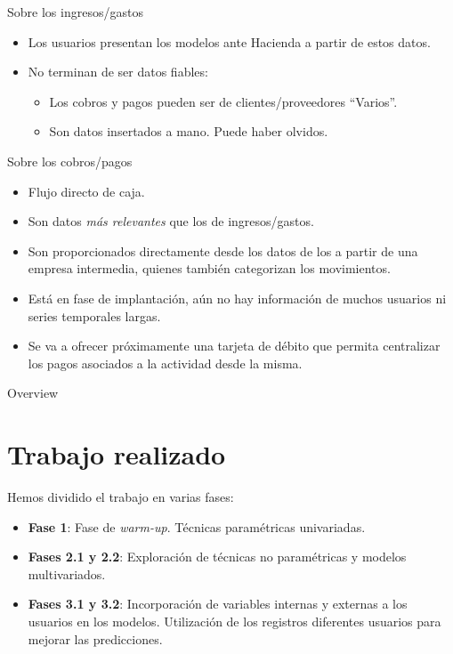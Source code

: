 \documentclass[12pt, aspectratio=169]{beamer} %
\begin{document}
\begin{frame}{Sobre los ingresos/gastos}
  \begin{itemize}
  \item Los usuarios presentan los modelos ante Hacienda a partir de estos datos.
  \item No terminan de ser datos fiables:
    \begin{itemize}
    \item Los cobros y pagos pueden ser de clientes/proveedores ``Varios''.
    \item Son datos insertados a mano. Puede haber olvidos.
    \end{itemize}
  \end{itemize}
\end{frame}

\begin{frame}{Sobre los cobros/pagos}
  \begin{itemize}
  \item Flujo directo de caja.
  \item Son datos \textit{más relevantes} que los de ingresos/gastos. 
  \item Son proporcionados directamente desde los datos de los a partir de una empresa intermedia, quienes también categorizan los movimientos.
  \item Está en fase de implantación, aún no hay información de muchos usuarios ni series temporales largas.
  \item Se va a ofrecer próximamente una tarjeta de débito que permita centralizar los pagos asociados a la actividad desde la misma.
  \end{itemize}
\end{frame}


\begin{frame}{Overview}
\tableofcontents
\end{frame}


\section{Trabajo realizado}


\begin{frame}

  Hemos dividido el trabajo en varias fases:
  \begin{itemize}
  \item \textbf{Fase 1}: Fase de \textit{warm-up}. Técnicas paramétricas univariadas.
  \item \textbf{Fases 2.1 y 2.2}: Exploración de técnicas no paramétricas y modelos multivariados.
  \item \textbf{Fases 3.1 y 3.2}: Incorporación de variables internas y externas a los usuarios en los modelos. Utilización de los registros diferentes usuarios para mejorar las predicciones.
  \end{itemize}

\end{frame}
\end{document}
